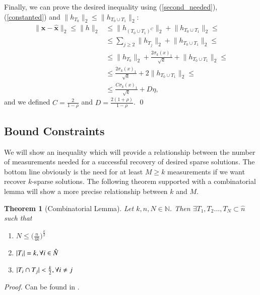 \documentclass[11pt,oneside,czech,american]{book} %
\theoremstyle{plain}
\newtheorem{thm}{Theorem}
\theoremstyle{definition}
\begin{document}
Finally, we can prove the desired inequality using (\ref{second_needed}), (\ref{constanted}) and $\lVert h_{T_0} \rVert_2 \leq \lVert h_{T_0 \cup T_1} \rVert_2$:
\begin{equation}
	\begin{aligned}
	\lVert \bm{x} - \bm{\hat{x}} \rVert_2 \leq \lVert h \rVert_2 &\leq \lVert h_{(T_0 \cup T_1)^C} \rVert_2 + \lVert h_{T_0 \cup T_1} \rVert_2 \leq \\
	&\leq \sum_{j\geq 2} \lVert h_{T_j} \rVert_2 + \lVert h_{T_0 \cup T_1} \rVert_2 \leq \\
	&\leq \lVert h_{T_0} \rVert_2 + \frac{ 2\sigma_k(x)_1}{\sqrt{k}} + \lVert h_{T_0 \cup T_1} \rVert_2 \leq \\
	&\leq \frac{ 2\sigma_k(x)_1}{\sqrt{k}} + 2 \lVert h_{T_0 \cup T_1} \rVert_2 \leq \\
	&\leq \frac{ C\sigma_k(x)_1}{\sqrt{k}} + D\eta,
	\end{aligned}
\end{equation}
and we defined $C = \frac{2}{1-\rho}$ and $D = \frac{2(1+\rho)}{1-\rho}$.
\qed

\subsection*{Bound Constraints}
We will show an inequality which will provide a relationship between the number of measurements needed for a successful recovery of desired sparse solutions. The bottom line obviously is the need for at least $M \geq k$ measurements if we want recover $k$-sparse solutions. The following theorem supported with a combinatorial lemma will show a more precise relationship between $k$ and $M$.

\begin{thm}[Combinatorial Lemma]
	Let $k,n,N \in \mathbb{N}$. Then $\exists T_1, T_2 \dots, T_N \subset \hat{n}$ such that
	\begin{enumerate}
		\item $N \leq \Big(\frac{n}{4k}\Big)^{\frac{k}{2}}$
		\item $|T_i|=k \space, \forall i \in \hat{N}$
		\item $|T_i \cap T_j| < \frac{k}{2} \space, \forall i \neq j$
	\end{enumerate}
\end{thm}

\emph{Proof.} Can be found in \parencite{boche15}.
\end{document}
